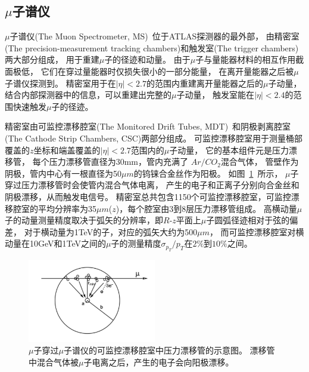 \subsection{$\mu$子谱仪}
\label{sec:ATLASMSP}

$\mu$子谱仪(The Muon Spectrometer, MS)~\cite{ATLASMUSPEC}位于ATLAS探测器的最外部，
由精密室(The precision-measurement tracking chambers)和触发室(The trigger chambers)两大部分组成，
用于重建$\mu$子的径迹和动量。
由于$\mu$子与量能器材料的相互作用截面极低，
它们在穿过量能器时仅损失很小的一部分能量，
在离开量能器之后被$\mu$子谱仪探测到。
精密室用于在$|\eta|<2.7$的范围内重建离开量能器之后的$\mu$子动量，
结合内部探测器中的信息，可以重建出完整的$\mu$子动量，
触发室能在$|\eta|<2.4$的范围快速触发$\mu$子的径迹。

精密室由可监控漂移腔室(The Monitored Drift Tubes, MDT)~\cite{ATLASMDT}和阴极剥离腔室(The Cathode Strip Chambers, CSC)两部分组成。
可监控漂移腔室用于测量桶部覆盖的$z$坐标和端盖覆盖的$|\eta|<2.7$范围内的$\mu$子动量，
它的基本组件元是压力漂移管，
每个压力漂移管直径为30mm，管内充满了
$Ar/CO_2$混合气体，
管壁作为阴极，管内中心有一根直径为50$\mu m$的钨铼合金丝作为阳极。
如图~\ref{fig:ATLASMS1}~所示，
$\mu$子穿过压力漂移管时会使管内混合气体电离，
产生的电子和正离子分别向合金丝和阴极漂移，从而触发电信号。
精密室总共包含1150个可监控漂移腔室，可监控漂移腔室的平均分辨率为35$\mu m$($z$)，每个腔室由3到8层压力漂移管组成。
高横动量$\mu$子的动量测量精度取决于弧矢的分辨率，即$R$-$z$平面上$\mu$子圆弧径迹相对于弦的偏差，
对于横动量为1TeV的子，对应的弧矢大约为500$\mu m$，
而可监控漂移腔室对横动量在10GeV和1TeV之间的$\mu$子的测量精度$\sigma_{p_{T}}/p_{T}$在$2\%$到$10\%$之间。

\begin{figure}
  \begin{center}
    \includegraphics[width=0.5\textwidth]{figuresEXP/ATLASMS1.jpg}
  \end{center}
  \caption{
  $\mu$子穿过$\mu$子谱仪的可监控漂移腔室中压力漂移管的示意图。
漂移管中混合气体被$\mu$子电离之后，产生的电子会向阳极漂移。
  }
    \label{fig:ATLASMS1}
\end{figure}

